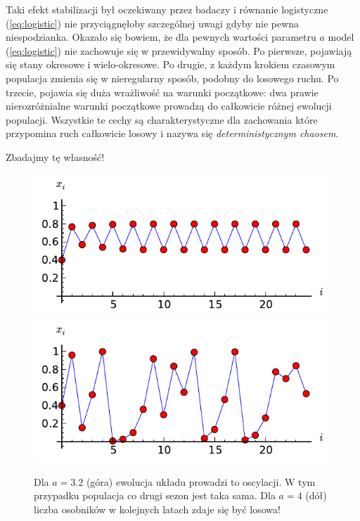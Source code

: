 \documentclass[12pt]{article}
\begin{document}
Taki efekt stabilizacji był oczekiwany przez badaczy i równanie
logistyczne (\ref{eq:logistic}) nie przyciągnęłoby szczególnej uwagi
gdyby nie pewna niespodzianka. Okazało się bowiem, że dla pewnych
wartości parametru $a$ model (\ref{eq:logistic}) nie zachowuje się w
przewidywalny sposób. Po pierwsze, pojawiają się stany okresowe i
wielo-okresowe. Po drugie, z każdym krokiem czasowym populacja zmienia
się w nieregularny sposób, podobny do losowego ruchu. Po trzecie,
pojawia się duża wrażliwość na warunki początkowe: dwa prawie
nierozróżnialne warunki początkowe prowadzą do całkowicie różnej
ewolucji populacji. Wszystkie te cechy są charakterystyczne dla
zachowania które przypomina ruch całkowicie losowy i nazywa się {\em
  deterministycznym chaosem}.

Zbadajmy tę własność! 
\begin{figure}
  \begin{center}
    \includegraphics{xi2.pdf}
    \includegraphics{xi3.pdf}
  \end{center}
 \caption{Dla $a=3.2$ (góra) ewolucja układu prowadzi to oscylacji. W
   tym przypadku populacja co drugi sezon jest taka sama. Dla $a=4$
   (dół) liczba osobników w kolejnych latach zdaje się być losowa!
 \label{fig:a34} }
\end{figure}
%
\end{document}
